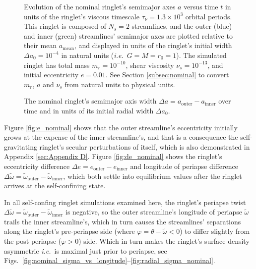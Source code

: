\documentclass[preprint]{aastex62}
\begin{document}
\begin{figure}
\caption{Evolution of the nominal ringlet's semimajor axes $a$
versus time $t$ in units of the ringlet's viscous timescale
$\tau_\nu=1.3\times10^3$ orbital periods. This ringlet is composed of $N_s=2$ streamlines,
and the outer (blue) and inner (green) streamlines' semimajor axes are plotted relative
to their mean $a_{\text{mean}}$, and displayed in units of the ringlet's
initial width $\Delta a_0 = 10^{-4}$ in natural units ({\it i.e.}\ $G=M=r_0=1$).
The simulated ringlet has total mass $m_r=10^{-10}$, shear viscosity $\nu_s=10^{-13}$,
and initial eccentricity $e=0.01$. See Section \ref{subsec:nominal} to convert
$m_r$, $a$ and $\nu_s$ from natural units to physical units.
\label{fig:a_nominal}}
\end{figure}

\begin{figure}
\caption{
\label{fig:da_nominal}
The nominal ringlet's semimajor axis width $\Delta a = a_{\text{outer}} - a_{\text{inner}}$ over time
and in units of its initial radial width $\Delta a_0$.}
\end{figure}

Figure \ref{fig:e_nominal} shows that the outer streamline's eccentricity initially grows at the
expense of the inner streamline's, and that is a consequence the self-gravitating ringlet's
secular perturbations of itself, which is also demonstrated in Appendix \ref{sec:Appendix D}. 
Figure \ref{fig:de_nominal} shows
the ringlet's eccentricity difference $\Delta e = e_{\text{outer}} - e_{\text{inner}}$
and longitude of periapse difference
$\Delta\tilde{\omega} = \tilde{\omega}_{\text{outer}} - \tilde{\omega}_{\text{inner}}$,
which both settle into equilibrium values after the ringlet arrives at the self-confining
state. 

In all self-confing ringlet simulations examined here, the ringlet's periapse twist 
$\Delta\tilde{\omega} = \tilde{\omega}_{\text{outer}} - \tilde{\omega}_{\text{inner}}$ is negative,
so the outer streamline's longitude of periapse $\tilde{\omega}$ trails
the inner streamline's, which in turn causes the streamlines' separations along
the ringlet's pre-periapse side (where $\varphi = \theta - \tilde{\omega} < 0$) 
to differ slightly from the post-periapse ($\varphi>0$) side.
Which in turn makes the ringlet's surface density asymmetric {\it i.e.}\ is
maximal just prior to periapse, see
Figs.\ \ref{fig:nominal_sigma_vs_longitude}--\ref{fig:radial_sigma_nominal}.
\end{document}
